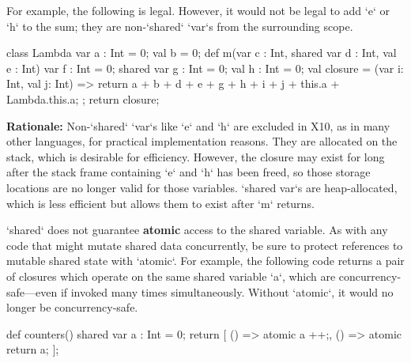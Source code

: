 For example, the following is legal.  However, it would not be legal to add
\xcd`e` or \xcd`h` to the sum; they are non-\xcd`shared` \xcd`var`s from the
surrounding scope.

\begin{xten}
class Lambda {
   var a : Int = 0;
   val b = 0;
   def m(var c : Int, shared var d : Int,  val e : Int) {
      var f : Int = 0;
      shared var g : Int = 0;
      val h : Int = 0;
      val closure = (var i: Int, val j: Int) => {
    	  return a + b + d + e + g + h + i + j + this.a + Lambda.this.a;
      };
      return closure;
   }
}
\end{xten}


{\bf Rationale:} Non-\xcd`shared` \xcd`var`s like \xcd`e` and \xcd`h` are
excluded in X10, as in many other languages, for practical implementation
reasons. They are allocated on the stack, which is desirable for efficiency.
However, the closure may exist for long after the stack frame containing
\xcd`e` and \xcd`h` has been freed, so those storage locations are no longer
valid for those variables. \xcd`shared var`s are heap-allocated, which is less
efficient but allows them to exist after \xcd`m` returns. 

\begin{note}
\xcd`shared` does not guarantee {\bf atomic} access to the shared variable. As
with any code that might mutate shared data concurrently, be sure to protect
references to mutable shared state with \xcd`atomic`. For example, the
following code returns a pair of closures which operate on the same shared
variable \xcd`a`, which are concurrency-safe---even if invoked many times
simultaneously. Without \xcd`atomic`, it would no longer be concurrency-safe.
\end{note}


\begin{xten}
  def counters() {
      shared var a : Int = 0;
       return [
          () => {atomic a ++;},
          () => {atomic return a;}
          ];
   }
\end{xten}
%



